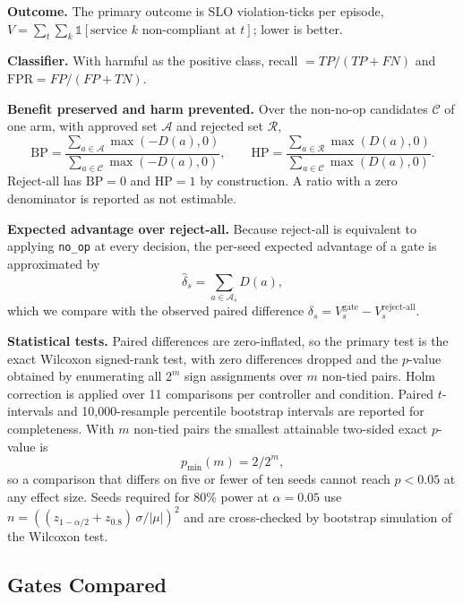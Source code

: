 \documentclass[conference]{IEEEtran}
\begin{document}
\textbf{Outcome.} The primary outcome is SLO violation-ticks per episode, $V = \sum_{t}\sum_{k} \mathbb{1}[\text{service } k \text{ non-compliant at } t]$; lower is better.

\textbf{Classifier.} With harmful as the positive class, recall $= TP/(TP+FN)$ and $\text{FPR} = FP/(FP+TN)$.

\textbf{Benefit preserved and harm prevented.} Over the non-no-op candidates $\mathcal{C}$ of one arm, with approved set $\mathcal{A}$ and rejected set $\mathcal{R}$,
\begin{equation}
\mathrm{BP} = \frac{\sum_{a \in \mathcal{A}} \max(-D(a),0)}{\sum_{a \in \mathcal{C}} \max(-D(a),0)}, \qquad
\mathrm{HP} = \frac{\sum_{a \in \mathcal{R}} \max(D(a),0)}{\sum_{a \in \mathcal{C}} \max(D(a),0)} .
\label{eq:bphp}
\end{equation}
Reject-all has $\mathrm{BP} = 0$ and $\mathrm{HP} = 1$ by construction. A ratio with a zero denominator is reported as not estimable.

\textbf{Expected advantage over reject-all.} Because reject-all is equivalent to applying \texttt{no\_op} at every decision, the per-seed expected advantage of a gate is approximated by
\begin{equation}
\widehat{\delta}_s = \sum_{a \in \mathcal{A}_s} D(a),
\label{eq:expadv}
\end{equation}
which we compare with the observed paired difference $\delta_s = V_s^{\text{gate}} - V_s^{\text{reject-all}}$.

\textbf{Statistical tests.} Paired differences are zero-inflated, so the primary test is the exact Wilcoxon signed-rank test, with zero differences dropped and the $p$-value obtained by enumerating all $2^m$ sign assignments over $m$ non-tied pairs. Holm correction is applied over 11 comparisons per controller and condition. Paired $t$-intervals and 10,000-resample percentile bootstrap intervals are reported for completeness. With $m$ non-tied pairs the smallest attainable two-sided exact $p$-value is
\begin{equation}
p_{\min}(m) = 2 / 2^{m},
\label{eq:pmin}
\end{equation}
so a comparison that differs on five or fewer of ten seeds cannot reach $p < 0.05$ at any effect size. Seeds required for 80\% power at $\alpha = 0.05$ use $n = \left((z_{1-\alpha/2} + z_{0.8})\,\sigma/|\mu|\right)^2$ and are cross-checked by bootstrap simulation of the Wilcoxon test.

\subsection{Gates Compared}
\end{document}
